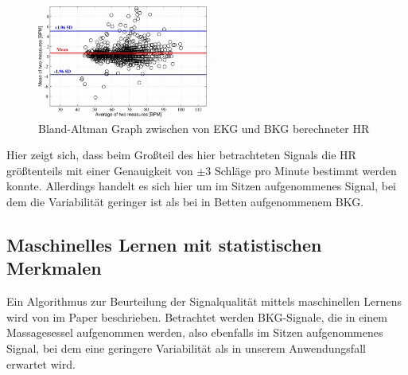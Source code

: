 	\begin{figure}[H]
		\centering
		\includegraphics[width=0.5\textwidth]{pic/bland-altman-pino.png}
		\caption[Genauigkeit der Herzratenberechnung bei schwellwertbasierter Artefakterkennung]{Bland-Altman Graph zwischen von \ac{EKG} und \ac{BKG} berechneter \ac{HR}}
		\label{fig:bland-altman-pino}
	\end{figure}
	
	Hier zeigt sich, dass beim Großteil des hier betrachteten Signals die \ac{HR} größtenteils mit einer Genauigkeit von $\pm 3$ Schläge pro Minute bestimmt werden konnte. Allerdings handelt es sich hier um im Sitzen aufgenommenes Signal, bei dem die Variabilität geringer ist als bei in Betten aufgenommenem \ac{BKG}.
	
	
	\subsection{Maschinelles Lernen mit statistischen Merkmalen}
	
	Ein Algorithmus zur Beurteilung der Signalqualität mittels maschinellen Lernens wird von \citeauthor{Sadek2016} im Paper  beschrieben. Betrachtet werden \ac{BKG}-Signale, die in einem Massagesessel aufgenommen werden, also ebenfalls im Sitzen aufgenommenes Signal, bei dem eine geringere Variabilität als in unserem Anwendungsfall erwartet wird.
	
